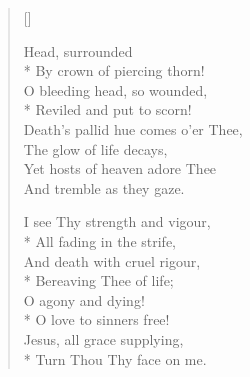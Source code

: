 \newHymn
{}
\begin{verse}[\versewidth]
\begin{altverse}
 Head, surrounded\\*
By crown of piercing thorn!\\
O bleeding head, so wounded,\\*
Reviled and put to scorn!\\
Death's pallid hue comes o'er Thee,\\
The glow of life decays,\\
Yet hosts of heaven adore Thee\\
And tremble as they gaze.
\end{altverse}

\begin{altverse}
I see Thy strength and vigour,\\*
All fading in the strife,\\
And death with cruel rigour,\\*
Bereaving Thee of life;\\
O agony and dying!\\*
O love to sinners free!\\
Jesus, all grace supplying,\\*
Turn Thou Thy face on me.
\end{altverse}





\end{verse}
